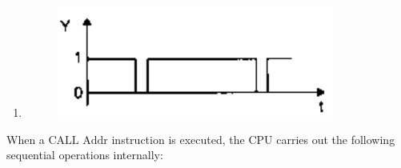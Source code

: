 \begin{enumerate}
\begin{figure}[!ht]
         \end{figure}
    \item \begin{figure}[!ht]
         \centering
         \includegraphics[scale=0.4]{GATE-yearwise/GATE(3)/figs/46d.png}
         \end{figure}
\end{enumerate}
\bigskip
\item
When a $\text{CALL Addr}$ instruction is executed, the CPU carries out the following sequential operations internally:


